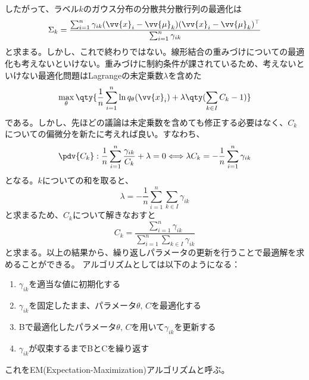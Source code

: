 \documentclass[a4paper,11pt,uplatex]{jsarticle}%
\begin{document}
したがって、ラベル$k$のガウス分布の分散共分散行列の最適化は
\begin{equation}
  \Sigma_k = \frac{\sum_{i=1}^n \gamma_{ik}(\vv{x}_i-\vv{\mu}_k)(\vv{x}_i - \vv{\mu}_k)^{\top} }{\sum_{i=1}^n \gamma_{ik}}
\end{equation}
と求まる。しかし、これで終わりではない。線形結合の重みづけについての最適化も考えないといけない。重みづけに制約条件が課されているため、考えないといけない最適化問題はLagrangeの未定乗数$\lambda$を含めた
\begin{equation}
  \max_{\theta}\qty{\frac{1}{n}\sum_{i=1}^n\ln{q_{\theta}(\vv{x}_i)} + \lambda\qty(\sum_{k\in I}C_k-1)}
\end{equation}
である。しかし、先ほどの議論は未定乗数を含めても修正する必要はなく、$C_k$についての偏微分を新たに考えれば良い。すなわち、
\begin{equation}
  \pdv{C_k}: \frac{1}{n}\sum_{i=1}^{n}\frac{\gamma_{ik}}{C_k} + \lambda = 0 \Longleftrightarrow \lambda C_k = -\frac{1}{n}\sum_{i=1}^n \gamma_{ik}
\end{equation}
となる。$k$についての和を取ると、
\begin{equation}
  \lambda = -\frac{1}{n}\sum_{i=1}^n \sum_{k\in I}\gamma_{ik}
\end{equation}
と求まるため、$C_k$について解きなおすと
\begin{equation}
  C_k = \frac{\sum_{i=1}^{n}\gamma_{ik}}{\sum_{i=1}^{n}\sum_{k\in I}\gamma_{ik}}
\end{equation}
と求まる。以上の結果から、繰り返しパラメータの更新を行うことで最適解を求めることができる。
アルゴリズムとしては以下のようになる：
\begin{enumerate}
  \item $\gamma_{ik}$を適当な値に初期化する
  \item $\gamma_{ik}$を固定したまま、パラメータ$\theta,\,C$を最適化する
  \item Bで最適化したパラメータ$\theta,\,C$を用いて$\gamma_{ik}$を更新する
  \item $\gamma_{ik}$が収束するまでBとCを繰り返す
\end{enumerate}
これをEM(Expectation-Maximization)アルゴリズムと呼ぶ。
\end{document}
